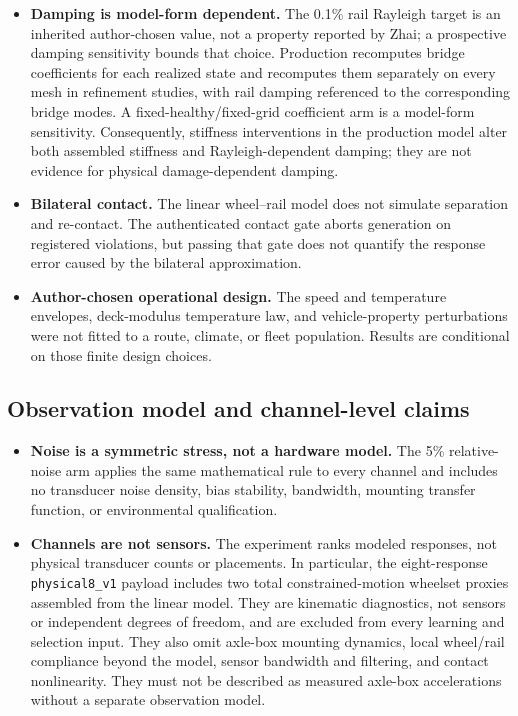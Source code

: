 \begin{itemize}
  \item \textbf{Damping is model-form dependent.} The 0.1\% rail Rayleigh
  target is an inherited author-chosen value, not a property reported by Zhai;
  a prospective damping sensitivity bounds that choice. Production recomputes
  bridge coefficients for each realized state and recomputes them separately
  on every mesh in refinement studies, with rail damping referenced to the
  corresponding bridge modes. A fixed-healthy/fixed-grid coefficient arm is a
  model-form sensitivity. Consequently, stiffness interventions in the
  production model alter both assembled stiffness and Rayleigh-dependent
  damping; they are not evidence for physical damage-dependent damping.

  \item \textbf{Bilateral contact.} The linear wheel--rail model does not
  simulate separation and re-contact. The authenticated contact gate aborts
  generation on registered violations, but passing that gate does not quantify
  the response error caused by the bilateral approximation.

  \item \textbf{Author-chosen operational design.} The speed and temperature
  envelopes, deck-modulus temperature law, and vehicle-property perturbations
  were not fitted to a route, climate, or fleet population. Results are
  conditional on those finite design choices.
\end{itemize}

\subsection{Observation model and channel-level claims}

\begin{itemize}
  \item \textbf{Noise is a symmetric stress, not a hardware model.} The 5\%
  relative-noise arm applies the same mathematical rule to every channel and
  includes no transducer noise density, bias stability, bandwidth, mounting
  transfer function, or environmental qualification.

  \item \textbf{Channels are not sensors.} The experiment ranks modeled
  responses, not physical transducer counts or placements. In particular, the
  eight-response \texttt{physical8\_v1} payload includes two total
  constrained-motion wheelset proxies assembled from the linear model. They are
  kinematic diagnostics, not sensors or independent degrees of freedom, and are
  excluded from every learning and selection input. They also omit axle-box
  mounting dynamics, local wheel/rail compliance beyond the model, sensor
  bandwidth and filtering, and contact nonlinearity. They must not be described
  as measured axle-box accelerations without a separate observation model.
\end{itemize}

